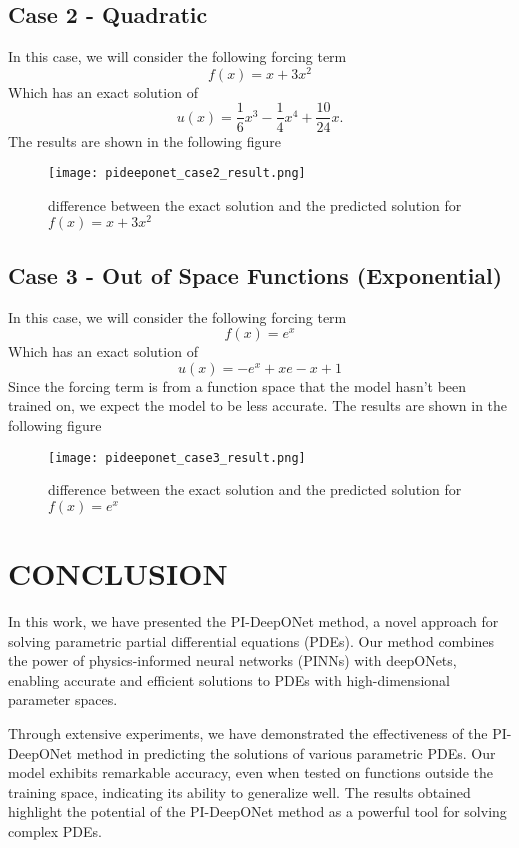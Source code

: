 \documentclass[a4paper, onecolumn, 12pt]{article}
\begin{document}
\subsection*{Case 2 - Quadratic}
In this case, we will consider the following forcing term
\[ f(x) = x + 3x^2 \] 
Which has an exact solution of 
\[u(x) = \dfrac{1}{6} x^3 - \dfrac{1}{4} x^4 + \dfrac{10}{24} x. \] 
The results are shown in the following figure
\begin{figure}[H]
    \centering 
    \texttt{[image: pideeponet\_case2\_result.png]}
    \label{quadratic_f}
    \caption[figure2]{difference between the exact solution and the predicted solution for $f(x) = x + 3x^2$}
\end{figure}


\subsection*{Case 3 - Out of Space Functions (Exponential) }
In this case, we will consider the following forcing term
\[f(x) = e^x\] 
Which has an exact solution of 
\[u(x) = - e^x +xe -x + 1\]
Since the forcing term is from a function space that the model hasn't been trained on, we expect the model to be less accurate.
The results are shown in the following figure
\begin{figure}[H]
    \centering 
    \texttt{[image: pideeponet\_case3\_result.png]}
    \label{exp_f}
    \caption[figure3]{difference between the exact solution and the predicted solution for $f(x) = e^x$}
\end{figure}
\section*{CONCLUSION}
In this work, we have presented the PI-DeepONet method, a novel approach for solving parametric partial differential equations (PDEs). Our method combines the power of physics-informed neural networks (PINNs) with deepONets, enabling accurate and efficient solutions to PDEs with high-dimensional parameter spaces.

Through extensive experiments, we have demonstrated the effectiveness of the PI-DeepONet method in predicting the solutions of various parametric PDEs. Our model exhibits remarkable accuracy, even when tested on functions outside the training space, indicating its ability to generalize well. The results obtained highlight the potential of the PI-DeepONet method as a powerful tool for solving complex PDEs.
\end{document}
